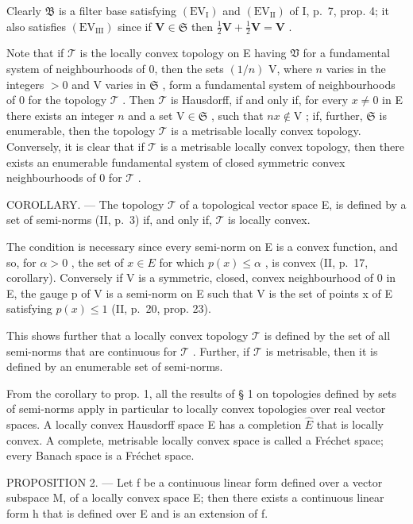 Clearly \(\mathfrak{B}\) is a filter base satisfying \((\mathrm{EV}_{\mathrm{I}})\) and \((\mathrm{EV}_{\mathrm{II}})\) of I, p.~7, prop. 4; it also satisfies \((\mathrm{EV}_{\mathrm{III}})\) since if \(\mathbf{V} \in \mathfrak{S}\) then \(\frac{1}{2}\mathbf{V} + \frac{1}{2}\mathbf{V} = \mathbf{V}\) .

Note that if \(\mathcal{T}\) is the locally convex topology on E having \(\mathfrak{V}\) for a fundamental system of neighbourhoods of 0, then the sets \((1/n)\) V, where \(n\) varies in the integers \(>0\) and V varies in \(\mathfrak{S}\) , form a fundamental system of neighbourhoods of 0 for the topology \(\mathcal{T}\) . Then \(\mathcal{T}\) is Hausdorff, if and only if, for every \(x \neq 0\) in E there exists an integer \(n\) and a set \(\mathrm{V} \in \mathfrak{S}\) , such that \(nx \notin \mathrm{V}\) ; if, further, \(\mathfrak{S}\) is enumerable, then the topology \(\mathcal{T}\) is a metrisable locally convex topology. Conversely, it is clear that if \(\mathcal{T}\) is a metrisable locally convex topology, then there exists an enumerable fundamental system of closed symmetric convex neighbourhoods of 0 for \(\mathcal{T}\) .

COROLLARY. --- The topology \(\mathcal{T}\) of a topological vector space E, is defined by a set of semi-norms (II, p.~3) if, and only if, \(\mathcal{T}\) is locally convex.

The condition is necessary since every semi-norm on E is a convex function, and so, for \(\alpha > 0\) , the set of \(x \in E\) for which \(p(x) \leqslant \alpha\) , is convex (II, p.~17, corollary). Conversely if V is a symmetric, closed, convex neighbourhood of 0 in E, the gauge p of V is a semi-norm on E such that V is the set of points x of E satisfying \(p(x) \leqslant 1\) (II, p.~20, prop. 23).

This shows further that a locally convex topology \(\mathcal{T}\) is defined by the set of all semi-norms that are continuous for \(\mathcal{T}\) . Further, if \(\mathcal{T}\) is metrisable, then it is defined by an enumerable set of semi-norms.

From the corollary to prop. 1, all the results of § 1 on topologies defined by sets of semi-norms apply in particular to locally convex topologies over real vector spaces. A locally convex Hausdorff space E has a completion \(\hat{E}\) that is locally convex. A complete, metrisable locally convex space is called a Fréchet space; every Banach space is a Fréchet space.

PROPOSITION 2. --- Let f be a continuous linear form defined over a vector subspace M, of a locally convex space E; then there exists a continuous linear form h that is defined over E and is an extension of f.

